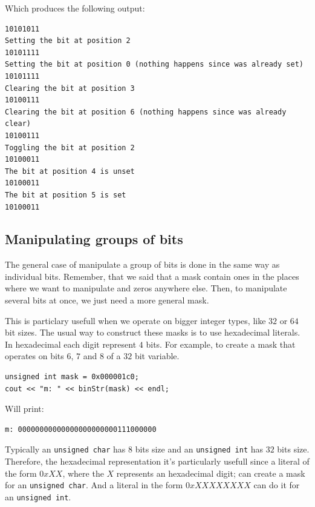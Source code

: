 Which produces the following output:
\begin{verbatim}
10101011
Setting the bit at position 2
10101111
Setting the bit at position 0 (nothing happens since was already set)
10101111
Clearing the bit at position 3
10100111
Clearing the bit at position 6 (nothing happens since was already clear)
10100111
Toggling the bit at position 2
10100011
The bit at position 4 is unset
10100011
The bit at position 5 is set
10100011  
\end{verbatim}

\subsection{Manipulating groups of bits}

The general case of manipulate a group of bits is done in the same way as individual bits.
Remember, that we said that a mask contain ones in the places where we want to manipulate and zeros anywhere else.
Then, to manipulate several bits at once, we just need a more general mask.

This is particlary usefull when we operate on bigger integer types, like $32$ or $64$ bit sizes.
The usual way to construct these masks is to use hexadecimal literals.
In hexadecimal each digit represent $4$ bits.
For example, to create a mask that operates on bits $6$, $7$ and $8$ of a $32$ bit variable. 

\begin{verbatim}
unsigned int mask = 0x000001c0;
cout << "m: " << binStr(mask) << endl;
\end{verbatim}

Will print:
\begin{verbatim}
m: 00000000000000000000000111000000
\end{verbatim}

Typically an \texttt{unsigned char} has $8$ bits size and an \texttt{unsigned int} has $32$ bits size.
Therefore, the hexadecimal representation it's particularly usefull since a literal of the form $0xXX$, where the $X$ represents an hexadecimal digit; can create a mask for an \texttt{unsigned char}.
And a literal in the form $0xXXXXXXXX$ can do it for an \texttt{unsigned int}.
